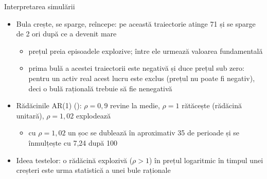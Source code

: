 \begin{frame}{Interpretarea simulării}
\itemsize{\small}
\begin{itemize}
    \item Bula crește, se sparge, reîncepe: pe această traiectorie atinge 71 și se sparge de 2 ori după ce a devenit mare
    \begin{itemize}
        \item prețul preia episoadele explozive; între ele urmează valoarea fundamentală
        \item prima bulă a acestei traiectorii este negativă și duce prețul sub zero: pentru un activ real acest lucru este exclus (prețul nu poate fi negativ), deci o bulă rațională trebuie să fie nenegativă
    \end{itemize}
    \item Rădăcinile AR(1) (): $\rho = 0{,}9$ revine la medie, $\rho = 1$ rătăcește (rădăcină unitară), $\rho = 1{,}02$ explodează
    \begin{itemize}
        \item cu $\rho = 1{,}02$ un șoc se dublează în aproximativ 35 de perioade și se înmulțește cu 7{,}24 după 100
    \end{itemize}
    \item Ideea testelor: o rădăcină explozivă ($\rho > 1$) în prețul logaritmic în timpul unei creșteri este urma statistică a unei bule raționale
\end{itemize}
\end{frame}

